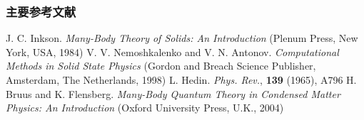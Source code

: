 \documentclass[cjk,slidestop,compress,mathserif,blue]{beamer}
\begin{document}

\begin{thebibliography}{99}
\frame
{
\frametitle{主要参考文献}
{\small
        \textrm{J. C. Inkson. \textit{Many-Body Theory of Solids: An Introduction} (Plenum Press, New York, USA, 1984)}
	\textrm{V. V. Nemoshkalenko and V. N. Antonov. \textit{Computational Methods in Solid State Physics} (Gordon and Breach Science Publisher, Amsterdam, The Netherlands, 1998)}
	\fontsize{9.2pt}{3.9pt}
	\textrm{L. Hedin. \textit{Phys. Rev.}, \textbf{139} (1965), A796}
	\textrm{H. Bruus and K. Flensberg. \textit{Many-Body Quantum Theory in Condensed Matter Physics: An Introduction} (Oxford University Press, U.K., 2004)}
}
\nocite*{}
}
\end{thebibliography}
\end{document}
